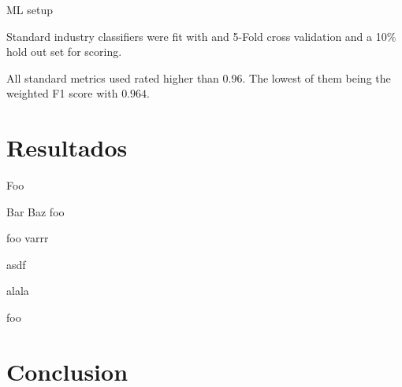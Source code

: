 \documentclass{beamer}
\begin{document}

\begin{frame}{ ML setup}


			Standard industry classifiers were fit with
			and 5-Fold cross validation and a 10\% hold out set for scoring.

			\medskip

			All standard metrics used rated higher than $0.96$. The lowest of them being the weighted F1 score with $0.964$.

%
%
%

\end{frame}


\section{Resultados}

%
%
%
%

\begin{frame}{Foo}
	\begin{block}{Bar}
		Baz
		\medskip
		foo
	\end{block}

	\pause

	\begin{block}{foo}
		varrr

		\medskip
			asdf

		\medskip
		alala

		\medskip
		foo
	\end{block}
\end{frame}


\section{Conclusion}
\end{document}
